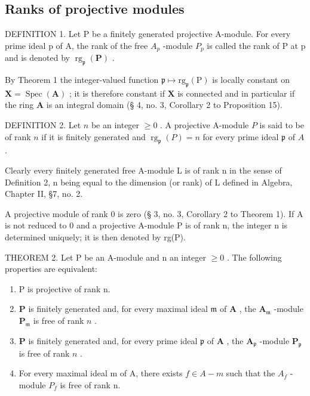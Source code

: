 \subsection{Ranks of projective modules}

DEFINITION 1. Let P be a finitely generated projective A-module. For every prime ideal p of A, the rank of the free \(A_{p}\) -module \(P_{p}\) is called the rank of P at p and is denoted by \(\operatorname{rg}_{\mathfrak{p}}(\mathbf{P})\) .

By Theorem 1 the integer-valued function \(\mathfrak{p} \mapsto \mathrm{rg}_{\mathfrak{p}}(\mathrm{P})\) is locally constant on \(\mathbf{X} = \operatorname{Spec}(\mathbf{A})\) ; it is therefore constant if \(\mathbf{X}\) is connected and in particular if the ring \(\mathbf{A}\) is an integral domain (§ 4, no. 3, Corollary 2 to Proposition 15).

DEFINITION 2. Let \(n\) be an integer \(\geqslant 0\) . A projective A-module \(P\) is said to be of rank \(n\) if it is finitely generated and \(\operatorname{rg}_{\mathfrak{p}}(P) = n\) for every prime ideal \(\mathfrak{p}\) of \(A\) .

Clearly every finitely generated free A-module L is of rank n in the sense of Definition 2, n being equal to the dimension (or rank) of L defined in Algebra, Chapter II, §7, no. 2.

A projective module of rank 0 is zero (§ 3, no. 3, Corollary 2 to Theorem 1). If A is not reduced to 0 and a projective A-module P is of rank n, the integer n is determined uniquely; it is then denoted by rg(P).

THEOREM 2. Let P be an A-module and n an integer \(\geqslant 0\) . The following properties are equivalent:

\begin{enumerate}
\def\labelenumi{(\alph{enumi})}
\item
  P is projective of rank n.
\item
  \(\mathbf{P}\) is finitely generated and, for every maximal ideal \(\mathfrak{m}\) of \(\mathbf{A}\) , the \(\mathbf{A}_{\mathfrak{m}}\) -module \(\mathbf{P}_{\mathfrak{m}}\) is free of rank \(n\) .
\item
  \(\mathbf{P}\) is finitely generated and, for every prime ideal \(\mathfrak{p}\) of \(\mathbf{A}\) , the \(\mathbf{A}_{\mathfrak{p}}\) -module \(\mathbf{P}_{\mathfrak{p}}\) is free of rank \(n\) .
\item
  For every maximal ideal m of A, there exists \(f \in A - m\) such that the \(A_{f}\) -module \(P_{f}\) is free of rank n.
\end{enumerate}


